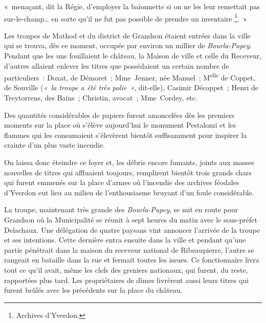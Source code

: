 \documentclass[french,twoside]{book} %
\newenvironment{quoteblock}%
  {\begin{quoting}}
  {\end{quoting}}
\newenvironment{quotebar}{%
    \def\FrameCommand{{\color{rubric!10!}\vrule width 0.5em} \hspace{0.9em}}%
    \def\OuterFrameSep{\itemsep} %
    \MakeFramed {\advance\hsize-\width \FrameRestore}
  }%
  {%
    \endMakeFramed
  }
\renewenvironment{quoteblock}%
  {%
    \savenotes
    \setstretch{0.9}
    \normalfont
    \begin{quotebar}
  }
  {%
    \end{quotebar}
    \spewnotes
  }
\begin{document}
\begin{quoteblock}
\noindent « menaçant, dit la Régie, d’employer la baïonnette si on ne les leur remettait pas sur-le-champ… en sorte qu’il ne fut pas possible de prendre un inventaire \footnote{Archives d’Yverdon.}. »\end{quoteblock}

\noindent Les troupes de Mathod et du district de Grandson étaient entrées dans la ville qui se trouva, dès ce moment, occupée par environ un millier de \emph{Bourla-Papey}. Pendant que les uns fouillaient le château, la Maison de ville et celle du Receveur, d’autres allaient enlever les titres que possédaient un certain nombre de particuliers : Doxat, de Démoret ; Mme Jenner, née Manuel ; M\textsuperscript{elle} de Coppet, de Souville (\emph{« la troupe a été très polie »}, dit-elle), Casimir Décoppet ; Henri de Treytorrens, des Bains ; Christin, avocat ; Mme Cordey, etc.\par
Des quantités considérables de papiers furent amoncelées dès les premiers moments sur la place où s’élève aujourd’hui le monument Pestalozzi et les flammes qui les consumaient s’élevèrent bientôt suffisamment pour inspirer la crainte d’un plus vaste incendie.\par
On laissa donc éteindre ce foyer et, les débris encore fumants, joints aux masses nouvelles de titres qui affluaient toujours, remplirent bientôt trois grands chars qui furent emmenés sur la place d’armes où l’incendie des archives féodales d’Yverdon eut lieu au milieu de l’enthousiasme bruyant d’un foule considérable.\par
La troupe, maintenant très grande des \emph{Bourla-Papey}, se mit en route pour Grandson où la Municipalité se réunit à sept heures du matin avec le sous-préfet Delachaux. Une délégation de quatre paysans vint annoncer l’arrivée de la troupe et ses intentions. Cette dernière entra ensuite dans la ville et pendant qu’une partie pénétrait dans la maison du receveur national de Ribeaupierre, l’autre se rangeait en bataille dans la rue et fermait toutes les issues. Ce fonctionnaire livra tout ce qu’il avait, même les clefs des greniers nationaux, qui furent, du reste, rapportées plus tard. Les propriétaires de dîmes livrèrent aussi leurs titres qui furent brûlés avec les précédents sur la place du château.\par
\end{document}
